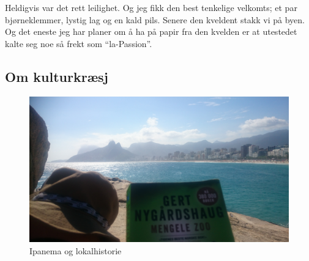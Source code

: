 Heldigvis var det rett leilighet. Og jeg fikk den best tenkelige
velkomts; et par
bjørneklemmer, lystig lag og en kald pils. Senere den kveldent stakk
vi på byen. Og det eneste jeg har planer om å ha på papir fra den
kvelden er at utestedet kalte seg noe så frekt som ``la-Passion''.
\clearpage

\subsection*{Om kulturkræsj}
\begin{figure}[h]
	\centering
	\includegraphics[width=\textwidth]{mengelezoo}
	\caption{Ipanema og lokalhistorie}
\label{fig:mengelezoo}

\end{figure}

